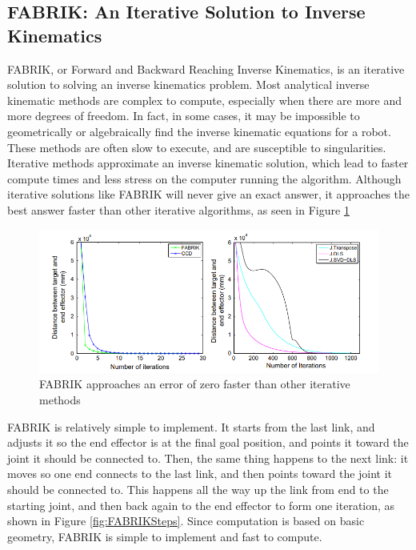 \subsection{FABRIK: An Iterative Solution to Inverse Kinematics} \label{sec:fabrik}
FABRIK, or Forward and Backward Reaching Inverse Kinematics, is an iterative solution to solving an inverse kinematics problem. Most analytical inverse kinematic methods are complex to compute, especially when there are more and more degrees of freedom. In fact, in some cases, it may be impossible to geometrically or algebraically find the inverse kinematic equations for a robot. These methods are often slow to execute, and are susceptible to singularities. Iterative methods approximate an inverse kinematic solution, which lead to faster compute times and less stress on the computer running the algorithm. Although iterative solutions like FABRIK will never give an exact answer, it approaches the best answer faster than other iterative algorithms, as seen in Figure \ref{fig:IterativeComparisons}
\begin{figure}[thbp]
    \centering
    \includegraphics[width=0.95\linewidth]{Figures/FABRIKComparisons}
    \caption{FABRIK approaches an error of zero faster than other iterative methods \cite{fabrik2011}}
    \label{fig:IterativeComparisons}
\end{figure}

FABRIK is relatively simple to implement. It starts from the last link, and adjusts it so the end effector is at the final goal position, and points it toward the joint it should be connected to. Then, the same thing happens to the next link: it moves so one end connects to the last link, and then points toward the joint it should be connected to. This happens all the way up the link from end to the starting joint, and then back again to the end effector to form one iteration, as shown in Figure \ref{fig:FABRIKSteps}. Since computation is based on basic geometry, FABRIK is simple to implement and fast to compute.

